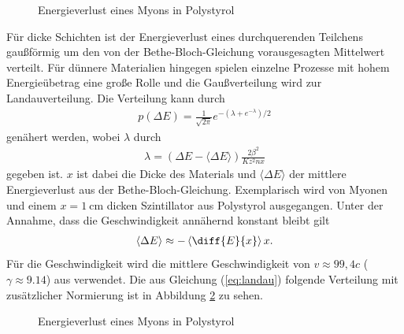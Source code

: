 \begin{figure}[h]
  \centering
  \caption{Energieverlust eines Myons in Polystyrol}
  \label{fig:bethe}
\end{figure}
Für dicke Schichten ist der Energieverlust eines durchquerenden Teilchens gaußförmig um den von der Bethe-Bloch-Gleichung vorausgesagten Mittelwert verteilt. Für dünnere Materialien hingegen spielen einzelne Prozesse mit hohem Energieübetrag eine große Rolle und die Gaußverteilung wird zur Landauverteilung. Die Verteilung kann durch
\begin{align}
  p(\Delta E)=\frac{1}{\sqrt{2\pi}}e^{-(\lambda+e^{-\lambda})/2}
  \label{eq:landau}
\end{align}
genähert werden, wobei $\lambda$ durch
\begin{align*}
  \lambda=(\Delta E-\langle \Delta E \rangle)\frac{2 \beta^2}{Kz^2nx}
\end{align*}
gegeben ist. $x$ ist dabei die Dicke des Materials und $\langle \Delta E \rangle$ der mittlere Energieverlust aus der Bethe-Bloch-Gleichung. Exemplarisch wird von Myonen und einem $x=\SI{1}{\cm}$ dicken Szintillator aus Polystyrol ausgegangen. Unter der Annahme, dass die Geschwindigkeit annähernd konstant bleibt gilt
\begin{align*}
  \langle \Delta E \rangle \approx -\left\langle  \diff{E}{x}  \right\rangle x. 
\end{align*}
Für die Geschwindigkeit wird die mittlere Geschwindigkeit von $v\approx 99,4 c$ ($\gamma \approx 9.14$) aus \cite{speed} verwendet. Die aus Gleichung (\ref{eq:landau}) folgende Verteilung mit zusätzlicher Normierung ist in Abbildung \ref{fig:landau} zu sehen.

\begin{figure}[h]
  \centering
  \caption{Energieverlust eines Myons in Polystyrol}
  \label{fig:landau}
\end{figure}

